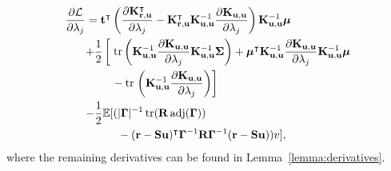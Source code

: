 \documentclass{mpaper}
\DeclareMathOperator{\adj}{adj}
\DeclareMathOperator{\tr}{tr}
\newcommand{\Kuu}{\mathbf{K}_{\mathbf{u},\mathbf{u}}}
\newcommand{\Kru}{\mathbf{K}_{\mathbf{r},\mathbf{u}}}
\begin{document}
\begin{align*}
  \frac{\partial \mathcal{L}}{\partial \lambda_j} &=
  \mathbf{t}^\intercal \left( \frac{\partial \Kru^\intercal}{\partial
      \lambda_j} - \Kru^\intercal\Kuu^{-1}\frac{\partial
      \Kuu}{\partial \lambda_j} \right) \Kuu^{-1} \bm\mu \\
  &\begin{aligned}
    + \frac{1}{2} \left[ \vphantom{\frac{\partial \Kuu}{\partial \lambda_j}}
    \right. &\tr \left( \Kuu^{-1} \frac{\partial \Kuu}{\partial \lambda_j}
      \Kuu^{-1} \bm\Sigma \right) + \bm\mu^\intercal \Kuu^{-1} \frac{\partial
      \Kuu}{\partial \lambda_j} \Kuu^{-1} \bm\mu \\
    &- \tr \left. \left(\Kuu^{-1} \frac{\partial \Kuu}{\partial \lambda_j}
      \right) \right]
  \end{aligned} \\
  &\begin{aligned}
    - \frac{1}{2} \mathbb{E} [ (&|\bm\Gamma|^{-1} \tr(\mathbf{R} \adj(\bm\Gamma)) \\
    &- (\mathbf{r} - \mathbf{Su})^\intercal\bm\Gamma^{-1}\mathbf{R}\bm\Gamma^{-1}(\mathbf{r} - \mathbf{Su})) v],
  \end{aligned} 
\end{align*}
where the remaining derivatives can be found in Lemma~\ref{lemma:derivatives}.
\end{document}
